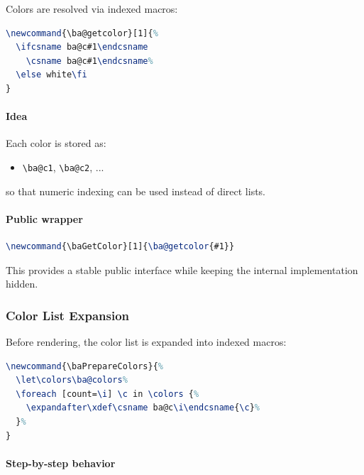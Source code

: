 Colors are resolved via indexed macros:

\begin{lstlisting}[language=LaTeX]
\newcommand{\ba@getcolor}[1]{%
  \ifcsname ba@c#1\endcsname
    \csname ba@c#1\endcsname%
  \else white\fi
}
\end{lstlisting}

\paragraph{Idea}

Each color is stored as:

\begin{itemize}
\item \texttt{\textbackslash ba@c1}, \texttt{\textbackslash ba@c2}, ...
\end{itemize}

so that numeric indexing can be used instead of direct lists.



\paragraph{Public wrapper}

\begin{lstlisting}[language=LaTeX]
\newcommand{\baGetColor}[1]{\ba@getcolor{#1}}
\end{lstlisting}

This provides a stable public interface while keeping the internal implementation hidden.



\subsubsection{Color List Expansion}

Before rendering, the color list is expanded into indexed macros:

\begin{lstlisting}[language=LaTeX]
\newcommand{\baPrepareColors}{%
  \let\colors\ba@colors%
  \foreach [count=\i] \c in \colors {%
    \expandafter\xdef\csname ba@c\i\endcsname{\c}%
  }%
}
\end{lstlisting}

\paragraph{Step-by-step behavior}

